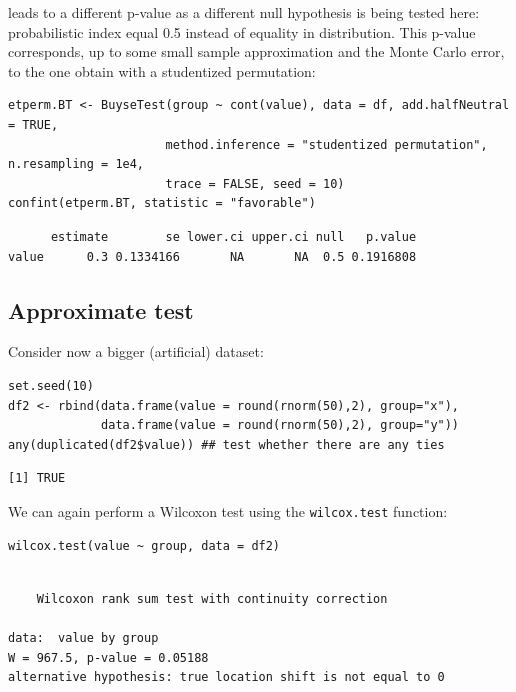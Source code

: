 \documentclass[12pt]{article}
\begin{document}
\noindent leads to a different p-value as a different null hypothesis
is being tested here: probabilistic index equal 0.5 instead of
equality in distribution. This p-value corresponds, up to some small
sample approximation and the Monte Carlo error, to the one obtain with
a studentized permutation:
\lstset{language=r,label= ,caption= ,captionpos=b,numbers=none}
\begin{lstlisting}
etperm.BT <- BuyseTest(group ~ cont(value), data = df, add.halfNeutral = TRUE,
                      method.inference = "studentized permutation", n.resampling = 1e4,
                      trace = FALSE, seed = 10)
confint(etperm.BT, statistic = "favorable")
\end{lstlisting}

\begin{verbatim}
      estimate        se lower.ci upper.ci null   p.value
value      0.3 0.1334166       NA       NA  0.5 0.1916808
\end{verbatim}

\subsection{Approximate test}
\label{sec:org0650600}

Consider now a bigger (artificial) dataset:
\lstset{language=r,label= ,caption= ,captionpos=b,numbers=none}
\begin{lstlisting}
set.seed(10)
df2 <- rbind(data.frame(value = round(rnorm(50),2), group="x"),
             data.frame(value = round(rnorm(50),2), group="y"))
any(duplicated(df2$value)) ## test whether there are any ties
\end{lstlisting}

\begin{verbatim}
[1] TRUE
\end{verbatim}


We can again perform a Wilcoxon test using the \texttt{wilcox.test} function:
\lstset{language=r,label= ,caption= ,captionpos=b,numbers=none}
\begin{lstlisting}
wilcox.test(value ~ group, data = df2)
\end{lstlisting}

\begin{verbatim}

	Wilcoxon rank sum test with continuity correction

data:  value by group
W = 967.5, p-value = 0.05188
alternative hypothesis: true location shift is not equal to 0
\end{verbatim}
\end{document}
